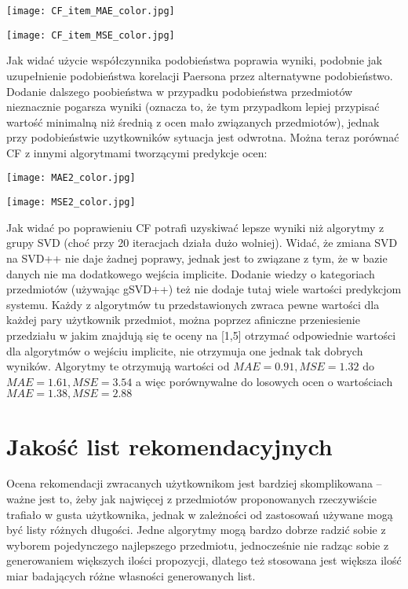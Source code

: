 \documentclass{pracamgr}
\begin{document}
   \begin{center}
    \texttt{[image: CF\_item\_MAE\_color.jpg]}
   \end{center}
   \begin{center}
    \texttt{[image: CF\_item\_MSE\_color.jpg]}
   \end{center}
   Jak widać użycie współczynnika podobieństwa poprawia wyniki, podobnie jak uzupełnienie podobieństwa korelacji Paersona przez alternatywne podobieństwo.
   Dodanie dalszego poobieństwa w przypadku podobieństwa przedmiotów nieznacznie pogarsza wyniki (oznacza to, że tym przypadkom lepiej przypisać wartość
   minimalną niż średnią z ocen mało związanych przedmiotów), jednak przy podobieństwie uzytkowników sytuacja jest odwrotna.
   Można teraz porównać CF z innymi algorytmami tworzącymi predykcje ocen:
   \begin{center}
    \texttt{[image: MAE2\_color.jpg]}
   \end{center}
   \begin{center}
    \texttt{[image: MSE2\_color.jpg]}
   \end{center}
   Jak widać po poprawieniu CF potrafi uzyskiwać lepsze wyniki niż algorytmy z grupy SVD (choć przy 20 iteracjach działa dużo wolniej).
   Widać, że zmiana SVD na SVD++ nie daje żadnej poprawy, jednak jest to związane z tym, że w bazie danych nie ma dodatkowego wejścia implicite.
   Dodanie wiedzy o kategoriach przedmiotów (używając gSVD++) też nie dodaje tutaj wiele wartości predykcjom systemu.
   Każdy z algorytmów tu przedstawionych zwraca pewne wartości dla każdej pary użytkownik przedmiot, można poprzez afiniczne przeniesienie przedziału
   w jakim znajdują się te oceny na [1,5] otrzymać odpowiednie wartości dla algorytmów o wejściu implicite, nie otrzymuja one jednak tak dobrych wyników.
   Algorytmy te otrzymują wartości od $MAE=0.91,MSE=1.32$ do $MAE=1.61,MSE=3.54$ a więc porównywalne do losowych ocen o
   wartościach $MAE=1.38,MSE=2.88$
  \section{Jakość list rekomendacyjnych}
   Ocena rekomendacji zwracanych użytkownikom jest bardziej skomplikowana -- ważne jest to, żeby jak najwięcej z przedmiotów proponowanych rzeczywiście trafiało
   w gusta użytkownika, jednak w zależności od zastosowań używane mogą być listy różnych długości.
   Jedne algorytmy mogą bardzo dobrze radzić sobie z wyborem pojedynczego najlepszego przedmiotu,
   jednocześnie nie radząc sobie z generowaniem większych ilości propozycji, dlatego też stosowana
   jest większa ilość miar badających różne własności generowanych list.
\end{document}
